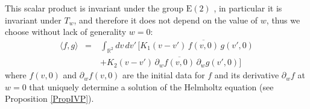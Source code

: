 \documentclass[11pt]{article}
\newcommand{\R}{\mathbb{R}}
\newcommand{\E}{\mathrm{E}}
\newcommand{\conj}[1]{\overline{#1}}
\begin{document}
This scalar product is invariant under the group $\E(2)$ \cite{Wolf81}, in particular
it is invariant under $T_w$, and therefore it does not depend on the value of $w$, thus we choose without lack of generality $w=0$:
\begin{eqnarray}\label{innerHelmholtz}
  \langle f,g\rangle &=&\int_{\R^2}dv\,dv'\,\Big[
    K_1(v-v')\,\conj{f(v,0)}\,g(v',0)\nonumber\\
  &\quad&+K_2(v-v')\,\partial_w \conj{f(v,0)}\,\partial_w g(v',0)\Big]
\end{eqnarray}
%
where $f(v,0)$ and $\partial_w f(v,0)$ are the initial data
for $f$ and its derivative $\partial_w f$ at $w=0$ that uniquely determine a
solution of the Helmholtz equation (see Proposition \ref{PropIVP}).

% 
\end{document}
